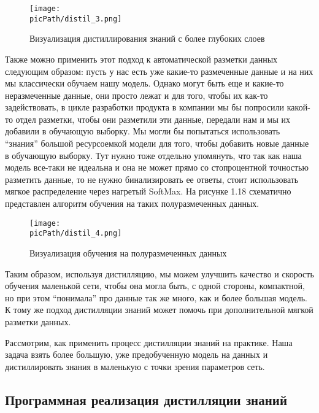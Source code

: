 \documentclass[oneside,final,12pt]{extreport}
\newcommand{\picPath}{images}
\begin{document}
\begin{figure}[H]
\begin{center}
  \texttt{[image: \\picPath/distil\_3.png]}
  \caption{Визуализация дистиллирования знаний с более глубоких слоев}
  \label{fig:distil_3}
  \end{center}
\end{figure}
Также можно применить этот подход к автоматической разметки данных следующим образом: пусть у нас есть уже какие-то размеченные данные и на них мы классически обучаем нашу модель. Однако могут быть еще и какие-то неразмеченные данные, они просто лежат и для того, чтобы их как-то задействовать, в цикле разработки продукта в компании мы бы попросили какой-то отдел разметки, чтобы они разметили эти данные, передали нам и мы их добавили в обучающую выборку. Мы могли бы попытаться использовать “знания” большой ресурсоемкой модели  для того, чтобы добавить новые данные в обучающую выборку. Тут нужно тоже отдельно упомянуть, что так как наша модель все-таки не идеальна и она не может прямо со стопроцентной точностью разметить данные, то не нужно бинализировать ее ответы, стоит использовать мягкое распределение через нагретый SoftMax. На рисунке 1.18 схематично представлен алгоритм обучения на таких полуразмеченных данных.
\begin{figure}[H]
\begin{center}
  \texttt{[image: \\picPath/distil\_4.png]}
  \caption{Визуализация обучения на полуразмеченных данных}
  \label{fig:distil_4}
  \end{center}
\end{figure}
Таким образом, используя дистилляцию, мы можем улучшить качество и скорость обучения маленькой сети, чтобы она могла быть, с одной стороны, компактной, но при этом “понимала” про данные так же много, как и более большая модель. К тому же подход дистилляции знаний может помочь при дополнительной мягкой разметки данных.

Рассмотрим, как применить процесс дистилляции знаний на практике. Наша задача взять более большую, уже предобученную модель на данных и дистиллировать знания в маленькую с точки зрения параметров сеть.
\subsection{Программная реализация дистилляции знаний}
\end{document}

